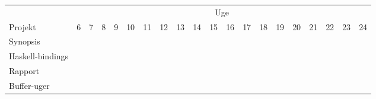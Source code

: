 \documentclass[a4paper,oneside, draft]{memoir}
\begin{document}
\noindent
\begin{landscape}
\begin{center}



\begin{tabular}{l||ccccccccccccccccccc}
& \multicolumn{19}{c}{Uge} \\
Projekt & 6 & 7 & 8 & 9 & 10 & 11 & 12 & 13 & 14 & 15 & 16 & 17 & 18 &
19 & 20 & 21 & 22 & 23 & 24\\ \hline \hline
Synopsis & \multicolumn{3}{c}{\cellcolor{black}} \\  
Haskell-bindings & & & \multicolumn{2}{c}{\cellcolor{red}} \\  
Rapport & & & & \multicolumn{5}{c}{\cellcolor{lightgrey}} &  \multicolumn{8}{c}{\cellcolor{grey}}\\  
Buffer-uger & \multicolumn{16}{c}{} & \multicolumn{3}{c}{\cellcolor{blue}} \\  
\end{tabular}
\end{center}
\end{landscape}
\end{document}
